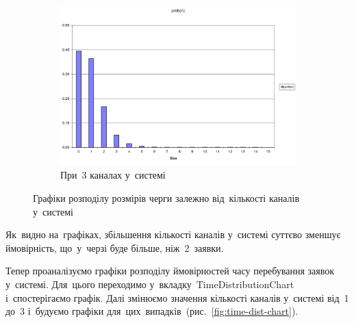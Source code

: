 \documentclass[
  a4paper,
  oneside,
  BCOR = 10mm,
  DIV = 12,
  12pt,
  headings = normal,
]{scrartcl}
\newlength{\gridunitwidth}
\begin{document}
\begin{figure}[!htbp]
\begin{subfigure}[b]{6 \gridunitwidth - 0.5 \gridunitwidth}
          \includegraphics[width = \columnwidth]{./assets/03-01.png}
          \caption{При~3 каналах у~системі}
          \label{subfig:size-dist-chart-03}
        \end{subfigure}
        \caption{Графіки розподілу розмірів черги залежно від~кількості каналів у~системі}
        \label{fig:size-dist-chart}
      \end{figure}

      Як~видно на~графіках, збільшення кількості каналів у~системі суттєво зменшує ймовірність, що~у~черзі буде більше, ніж~2~заявки.

      Тепер проаналізуємо графіки розподілу ймовірностей часу перебування заявок у~системі. Для~цього переходимо у~вкладку~\textenglish{TimeDistributionChart} і~спостерігаємо графік. Далі змінюємо значення кількості каналів у~системі від~1 до~3 і~будуємо графіки для~цих~випадків~(рис.~\ref{fig:time-dist-chart}).
\end{document}
